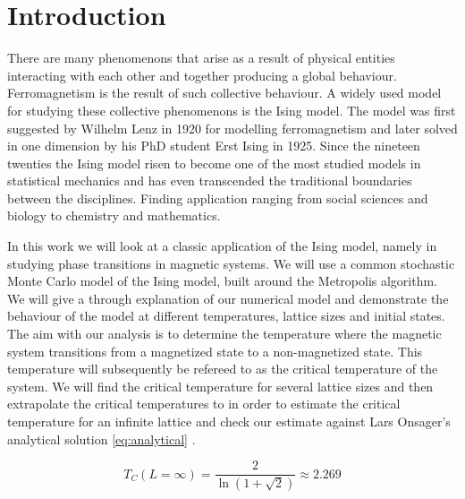 \section{Introduction}
There are many phenomenons that arise as a result of physical entities
interacting with each other and together producing a global behaviour.
Ferromagnetism is the result of such collective behaviour. A widely used model
for studying these collective phenomenons is the Ising model.
The model was first suggested by Wilhelm Lenz in 1920 for modelling
ferromagnetism and later solved 
in one dimension by his PhD student Erst Ising in 1925. Since the nineteen
twenties the Ising model risen to become one of the most studied models in
statistical mechanics and has even
transcended the traditional boundaries between the disciplines. Finding
application ranging from social sciences and biology to chemistry and
mathematics.

In this work we will look at a classic application of the Ising model, namely
in studying phase transitions in magnetic systems. We will use a common
stochastic Monte Carlo model of the Ising model, built around the Metropolis algorithm. We will give a through explanation of our numerical model
and demonstrate the behaviour of the model at different temperatures, lattice
sizes and initial states. The aim with our analysis is to determine the
temperature where the magnetic system transitions from a 
magnetized state to a non-magnetized state. This
temperature will subsequently be refereed to as the critical
temperature of the system. We will find the critical temperature for several lattice sizes
and then extrapolate the critical temperatures to in order to estimate the
critical temperature for an infinite lattice and
check our estimate against Lars Onsager's analytical solution
\cref{eq:analytical} \parencite{Lars1944}.

\begin{equation}
  \label{eq:analytical}
  T_C(L=\infty) = \frac{2}{\ln(1 + \sqrt2)} \approx 2.269
\end{equation}



